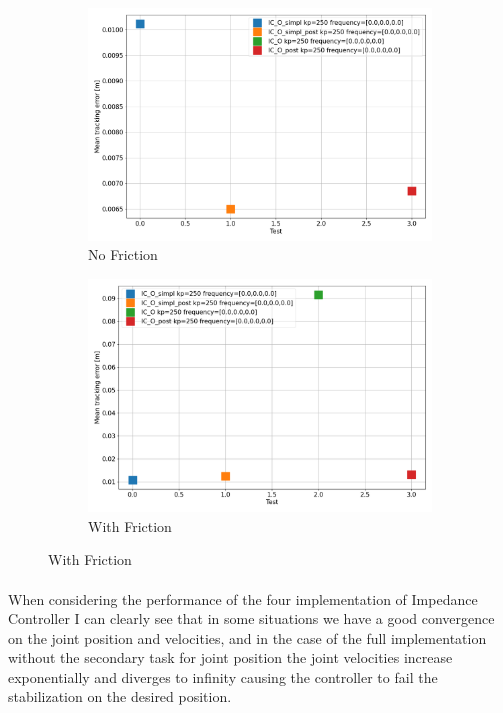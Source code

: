 \documentclass[12pt]{article}
\begin{document}
\begin{figure}[h!]
    \centering
    \begin{subfigure}[b]{0.4\linewidth}
    \includegraphics[width=\linewidth]{images/Image1.png}
    \caption{No Friction}
    \end{subfigure}
    \begin{subfigure}[b]{0.4\linewidth}
    \includegraphics[width=\linewidth]{images/Image2.png}
    \caption{With Friction}
    \end{subfigure}
  \label{fig:psnofriction}
\end{figure}

\paragraph*{}
When considering the performance of the four implementation of Impedance Controller I can clearly see that in some situations we have a good convergence on the joint position and velocities,
and in the case of the full implementation without the secondary task for joint position the joint velocities increase exponentially and diverges to infinity
causing the controller to fail the stabilization on the desired position.
\end{document}

